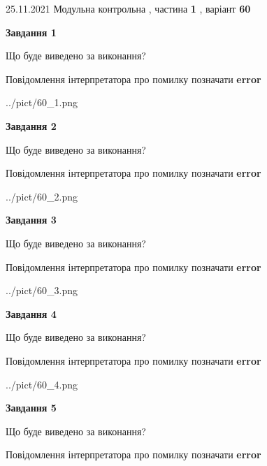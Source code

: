 \documentclass[10pt, ukrainian]{article}
\begin{document}
{25.11.2021 Модульна контрольна , частина \textbf { 1 }, варіант  \No \textbf { 60 }\par}
{
\begin {large}

{\begin {center}\textbf{Завдання 1}\end {center}}\par
Що буде виведено за виконання? \par
Повідомлення інтерпретатора про помилку позначати \textbf{error}

\begin{center}
	{../pict/60_1.png}
\end{center}
\newpage

{\begin {center}\textbf{Завдання 2}\end {center}}\par
Що буде виведено за виконання? \par
Повідомлення інтерпретатора про помилку позначати \textbf{error}

\begin{center}
	{../pict/60_2.png}
\end{center}
\newpage

{\begin {center}\textbf{Завдання 3}\end {center}}\par
Що буде виведено за виконання? \par
Повідомлення інтерпретатора про помилку позначати \textbf{error}

\begin{center}
	{../pict/60_3.png}
\end{center}
\newpage

{\begin {center}\textbf{Завдання 4}\end {center}}\par
Що буде виведено за виконання? \par
Повідомлення інтерпретатора про помилку позначати \textbf{error}

\begin{center}
	{../pict/60_4.png}
\end{center}
\newpage

{\begin {center}\textbf{Завдання 5}\end {center}}\par
Що буде виведено за виконання? \par
Повідомлення інтерпретатора про помилку позначати \textbf{error}


\end{large}}
\end{document}

